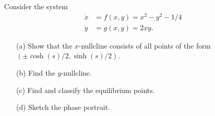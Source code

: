 \documentclass[a4paper]{amsart}
\begin{document}
\begin{exercise}\label{ex-complex-square-offset}
 Consider the system 
 \begin{align*}
  \dot{x} &= f(x,y) = x^2-y^2-1/4 \\
  \dot{y} &= g(x,y) = 2xy.
 \end{align*}
 \begin{itemize}
  \item[(a)] Show that the $x$-nullcline consists of all points of the
   form $(\pm\cosh(s)/2,\sinh(s)/2)$.
  \item[(b)] Find the $y$-nullcline.
  \item[(c)] Find and classify the equilibrium points.
  \item[(d)] Sketch the phase portrait.
 \end{itemize}
\end{exercise}
\end{document}
